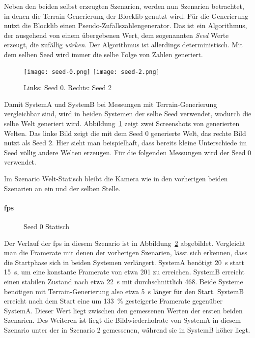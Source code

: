 Neben den beiden selbst erzeugten Szenarien, werden nun Szenarien betrachtet, in denen die Terrain-Generierung der Blocklib genutzt wird. Für die Generierung nutzt die Blocklib einen Pseudo-Zufallszahlengenerator. Das ist ein Algorithmus, der ausgehend von einem übergebenen Wert, dem sogenannten \emph{Seed} Werte erzeugt, die zufällig \emph{wirken}. Der Algorithmus ist allerdings deterministisch. Mit dem selben Seed wird immer die selbe Folge von Zahlen generiert.

\begin{figure}
	\centering
	\texttt{[image: seed-0.png]}
	\hfill
	\texttt{[image: seed-2.png]}
	\caption{Links: Seed 0. Rechts: Seed 2}\label{fig:static}
\end{figure}
Damit SystemA und SystemB bei Messungen mit Terrain-Generierung vergleichbar sind, wird in beiden Systemen der selbe Seed verwendet, wodurch die selbe Welt generiert wird. Abbildung~\ref{fig:static} zeigt zwei Screenshots von generierten Welten. Das linke Bild zeigt die mit dem Seed $0$ generierte Welt, das rechte Bild nutzt als Seed $2$. Hier sieht man beispielhaft, dass bereits kleine Unterschiede im Seed völlig andere Welten erzeugen. Für die folgenden Messungen wird der Seed $0$ verwendet. 

Im Szenario Welt-Statisch bleibt die Kamera wie in den vorherigen beiden Szenarien an ein und der selben Stelle.



\paragraph{\ac{fps}}
\begin{figure}[!htbp]
	\caption{Seed 0 Statisch}\label{fig:seed-0-static-fps}
\end{figure}
Der Verlauf der \ac{fps} in diesem Szenario ist in Abbildung~\ref{fig:seed-0-static-fps} abgebildet. Vergleicht man die Framerate mit denen der vorherigen Szenarien, lässt sich erkennen, dass die Startphase sich in beiden Systemen verlängert. SystemA benötigt \SI{20}{\second} statt \SI{15}{\second}, um eine konstante Framerate von etwa \SI{201}{\fps} zu erreichen. SystemB erreicht einen stabilen Zustand nach etwa \SI{22}{\second} mit durchschnittlich \SI{468}{\fps}.
Beide Systeme benötigen mit Terrain-Generierung also etwa \SI{5}{\second} länger für den Start. SystemB erreicht nach dem Start eine um \SI{133}{\percent} gesteigerte Framerate gegenüber SystemA. Dieser Wert liegt zwischen den gemessenen Werten der ersten beiden Szenarien. Des Weiteren ist liegt die Bildwiederholrate von SystemA in diesem Szenario unter der in Szenario 2 gemessenen, während sie in SystemB höher liegt.

